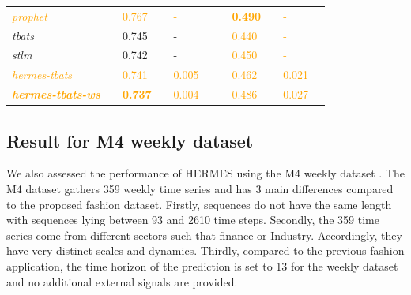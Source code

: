 \documentclass[10pt]{article} %
\begin{document}
\begin{table}
{\begin{tabular}{l||lllll|lllll}
     \textcolor{orange}{\textit{prophet}} && \textcolor{orange}{0.767} && \textcolor{orange}{-} &&& \textcolor{orange}{\textbf{0.490}} && \textcolor{orange}{-} &\\
     \textit{tbats} && 0.745 && - &&& \textcolor{orange}{0.440} && \textcolor{orange}{-} &\\
     \textit{stlm} && 0.742 && - &&& \textcolor{orange}{0.450} && \textcolor{orange}{-} &\\
     \textcolor{orange}{\textit{hermes-tbats}} && \textcolor{orange}{0.741} && \textcolor{orange}{0.005} &&& \textcolor{orange}{0.462} && \textcolor{orange}{0.021} &\\
     \textcolor{orange}{\textbf{\textit{hermes-tbats-ws}}} && \textcolor{orange}{\textbf{0.737}} && \textcolor{orange}{0.004} &&& \textcolor{orange}{0.486} && \textcolor{orange}{0.027} &\\
  \end{tabular}
 }
\label{tab:1000metricresults}
\end{table}


\subsection{Result for M4 weekly dataset}
\label{sec:m4result}

We also assessed the performance of HERMES using the M4 weekly dataset \citep{makridakis2020}. The M4 dataset gathers 359 weekly time series and has 3 main differences compared to the proposed fashion dataset. Firstly, sequences do not have the same length with sequences lying between 93 and 2610 time steps. Secondly, the 359 time series come from different sectors such that finance or Industry. Accordingly, they have very distinct scales and dynamics. Thirdly, compared to the previous fashion application, the time horizon of the prediction is set to 13 for the weekly dataset and no additional external signals are provided.
\end{document}
